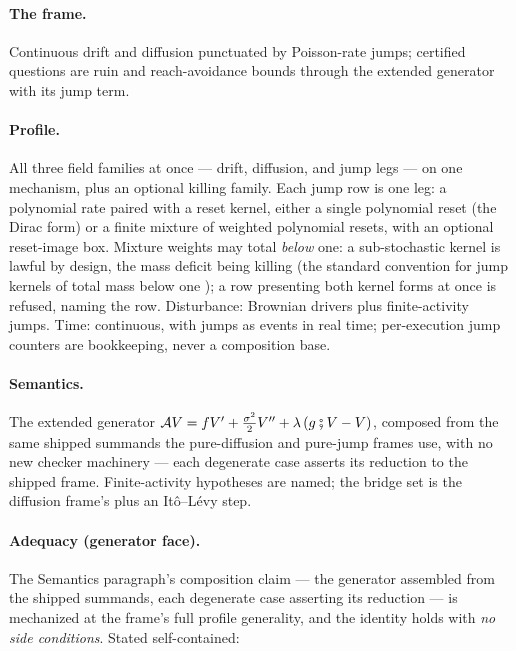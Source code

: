 \paragraph{The frame.} Continuous drift and diffusion punctuated by
Poisson-rate jumps; certified questions are ruin and reach-avoidance
bounds through the extended generator with its jump term.

\paragraph{Profile.} All three field families at once --- drift,
diffusion, and jump legs --- on one mechanism, plus an optional
killing family. Each jump row is one leg: a polynomial rate paired
with a reset kernel, either a single polynomial reset (the Dirac
form) or a finite mixture of weighted polynomial resets, with an
optional reset-image box. Mixture weights may total \emph{below} one:
a sub-stochastic kernel is lawful by design, the mass deficit being
killing (the standard convention for jump kernels of total mass below
one \cite{davis-1993}); a row presenting both kernel forms at once is
refused, naming the row. Disturbance: Brownian drivers plus
finite-activity jumps. Time: continuous, with jumps as events in real
time; per-execution jump counters are bookkeeping, never a
composition base.

\paragraph{Semantics.} The extended generator
$\mathcal{A}V = f V' + \tfrac{\sigma^2}{2} V'' +
\lambda\,(g \fatsemi V - V)$, composed from the same shipped summands the
pure-diffusion and pure-jump frames use, with no new checker
machinery --- each degenerate case asserts its reduction to the
shipped frame. Finite-activity hypotheses are named; the bridge set is
the diffusion frame's plus an It\^o--L\'evy step.

\paragraph{Adequacy (generator face).} The Semantics paragraph's
composition claim --- the generator assembled from the shipped
summands, each degenerate case asserting its reduction --- is
mechanized at the frame's full profile generality, and the identity
holds with \emph{no side conditions}. Stated self-contained:

